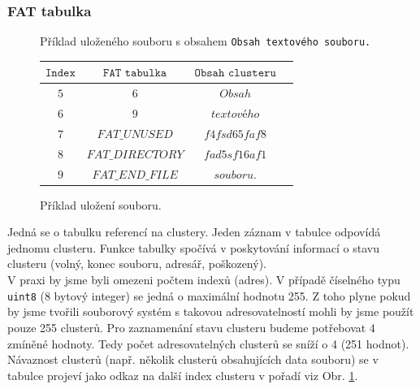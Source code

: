 \documentclass[12pt]{article}
\begin{document}
\subsubsection{FAT tabulka}

\begin{figure}
\centering
\vspace{-0.5cm}

Příklad uloženého souboru s obsahem \texttt{Obsah textového souboru.}
\linebreak

\begin{tabular}{|c|c|c|c|}
$\texttt{Index}$ & $\texttt{FAT tabulka}$ & $\texttt{Obsah clusteru}$\\\hline
$5$ & $6$ 				& $Obsah$\\\hline
$6$ & $9$ 				& $textového$\\\hline
$7$ & $FAT\_UNUSED$ 	& $f4fsd65faf8$\\\hline
$8$ & $FAT\_DIRECTORY$ 	& $fad5sf16af1$\\\hline
$9$ & $FAT\_END\_FILE$ 	& $souboru.$\\\hline
\end{tabular}
\caption{Příklad uložení souboru.}
\label{obr1}
\end{figure}

Jedná se o tabulku referencí na clustery. Jeden záznam v tabulce odpovídá jednomu clusteru. Funkce tabulky spočívá v poskytování informací o stavu clusteru (volný, konec souboru, adresář, poškozený). 
\\V praxi by jsme byli omezeni počtem indexů (adres). V případě číselného typu \texttt{uint8} (8 bytový integer) se jedná o maximální hodnotu 255. Z toho plyne pokud by jsme tvořili souborový systém s takovou adresovatelností mohli by jsme použít pouze 255 clusterů. Pro zaznamenání stavu clusteru budeme potřebovat 4 zmíněné hodnoty. Tedy počet adresovatelných clusterů se sníží o 4 (251 hodnot). Návaznost clusterů (např. několik clusterů obsahujících data souboru) se v tabulce projeví jako odkaz na další index clusteru v pořadí viz Obr. \ref{obr1}.
\end{document}
